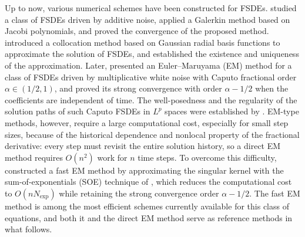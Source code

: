 \documentclass[11pt, a4paper]{article}
\theoremstyle{theoremstyle}
\theoremstyle{definitionstyle}
\begin{document}
Up to now, various numerical schemes have been constructed for FSDEs.
\cite{kamrani2015} studied a class of FSDEs driven by additive noise, applied
a Galerkin method based on Jacobi polynomials, and proved the convergence of
the proposed method. \cite{ahmadi2017} introduced a collocation method based
on Gaussian radial basis functions to approximate the solution of FSDEs, and
established the existence and uniqueness of the approximation. Later,
\cite{doan2020euler} presented an Euler--Maruyama (EM) method for a class of
FSDEs driven by multiplicative white noise with Caputo fractional order
$\alpha\in(1/2,1)$, and proved its strong convergence with order
$\alpha-1/2$ when the coefficients are independent of time. The
well-posedness and the regularity of the solution paths of such Caputo FSDEs in
$L^p$ spaces were established by \cite{huong2023lp}. EM-type methods, however,
require a large computational cost, especially for small step sizes, because of
the historical dependence and nonlocal property of the fractional derivative:
every step must revisit the entire solution history, so a direct EM method
requires $O(n^2)$ work for $n$ time steps. To overcome this difficulty,
\cite{zhang2023fast} constructed a fast EM method by approximating the singular
kernel with the sum-of-exponentials (SOE) technique of \cite{jiang2017}, which
reduces the computational cost to $O(n N_{\mathrm{exp}})$ while retaining the
strong convergence order $\alpha-1/2$. The fast EM method is among the
most efficient schemes currently available for this class of equations, and both
it and the direct EM method serve as reference methods in what follows.
\end{document}
